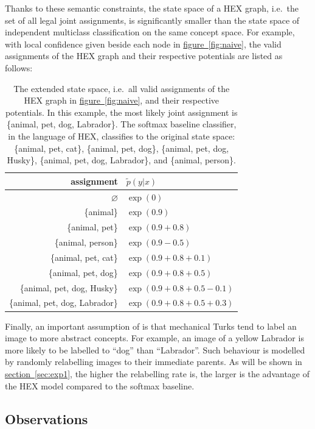 \documentclass[11pt,a4paper]{article}
\begin{document}
Thanks to these semantic constraints, the state space of a HEX graph, i.e.\ the set of all legal joint assignments, is significantly smaller than the state space of independent multiclass classification on the same concept space. For example, with local confidence given beside each node in \hyperref[fig:naive]{figure~\ref{fig:naive}}, the valid assignments of the HEX graph and their respective potentials are listed as follows:

\begin{table}[htbp]
\centering
\begin{tabular}{r|l}
assignment & $\tilde{p}(y|x)$\\
\hline
$\varnothing$ & $\exp(0)$\\
\{animal\} & $\exp(0.9)$\\
\{animal, pet\} & $\exp(0.9+0.8)$\\
\{animal, person\} & $\exp(0.9-0.5)$\\
\{animal, pet, cat\} & $\exp(0.9+0.8+0.1)$\\
\{animal, pet, dog\} & $\exp(0.9+0.8+0.5)$\\
\{animal, pet, dog, Husky\} & $\exp(0.9+0.8+0.5-0.1)$\\
\{animal, pet, dog, Labrador\} & $\exp(0.9+0.8+0.5+0.3)$
\end{tabular}
\caption{The extended state space, i.e.\ all valid assignments of the HEX graph in \hyperref[fig:naive]{figure~\ref{fig:naive}}, and their respective potentials. In this example, the most likely joint assignment is \{animal, pet, dog, Labrador\}. The softmax baseline classifier, in the language of HEX, classifies to the original state space: \{animal, pet, cat\}, \{animal, pet, dog\}, \{animal, pet, dog, Husky\}, \{animal, pet, dog, Labrador\}, and \{animal, person\}.}
\label{tab:naive}
\end{table}

Finally, an important assumption of \cite{deng2014large} is that mechanical Turks tend to label an image to more abstract concepts. For example, an image of a yellow Labrador is more likely to be labelled to ``dog'' than ``Labrador''. Such behaviour is modelled by randomly relabelling images to their immediate parents. As will be shown in \hyperref[sec:exp1]{section~\ref{sec:exp1}}, the higher the relabelling rate is, the larger is the advantage of the HEX model compared to the softmax baseline.

\subsection{Observations}
\label{sec:observ}
\end{document}
